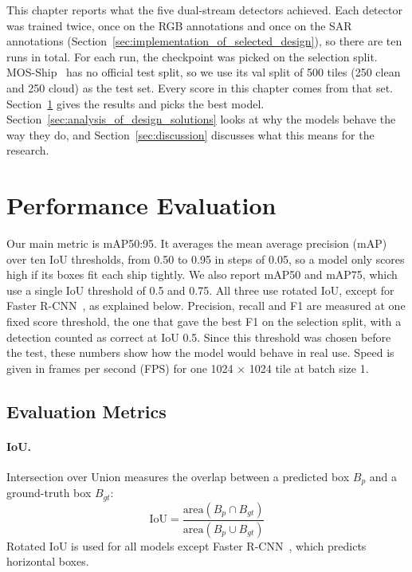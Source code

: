 This chapter reports what the five dual-stream detectors achieved. Each detector was trained twice, once on the RGB annotations and once on the SAR annotations (Section~\ref{sec:implementation_of_selected_design}), so there are ten runs in total. For each run, the checkpoint was picked on the selection split. MOS-Ship~\cite{you2026multi} has no official test split, so we use its val split of 500 tiles (250 clean and 250 cloud) as the test set. Every score in this chapter comes from that set. Section~\ref{sec:performance_evaluation} gives the results and picks the best model. Section~\ref{sec:analysis_of_design_solutions} looks at why the models behave the way they do, and Section~\ref{sec:discussion} discusses what this means for the research.

\section{Performance Evaluation}
\label{sec:performance_evaluation}
Our main metric is mAP50:95. It averages the mean average precision (mAP) over ten IoU thresholds, from 0.50 to 0.95 in steps of 0.05, so a model only scores high if its boxes fit each ship tightly. We also report mAP50 and mAP75, which use a single IoU threshold of 0.5 and 0.75. All three use rotated IoU, except for Faster R-CNN~\cite{7485869}, as explained below. Precision, recall and F1 are measured at one fixed score threshold, the one that gave the best F1 on the selection split, with a detection counted as correct at IoU 0.5. Since this threshold was chosen before the test, these numbers show how the model would behave in real use. Speed is given in frames per second (FPS) for one 1024 × 1024 tile at batch size 1.

\subsection{Evaluation Metrics}

\paragraph{IoU.}
Intersection over Union measures the overlap between a predicted box
$B_p$ and a ground-truth box $B_{gt}$:
\begin{equation}
\mathrm{IoU} = \frac{\mathrm{area}(B_p \cap B_{gt})}{\mathrm{area}(B_p \cup B_{gt})}
\end{equation}
Rotated IoU is used for all models except Faster R-CNN~\cite{7485869}, which predicts
horizontal boxes.\\

